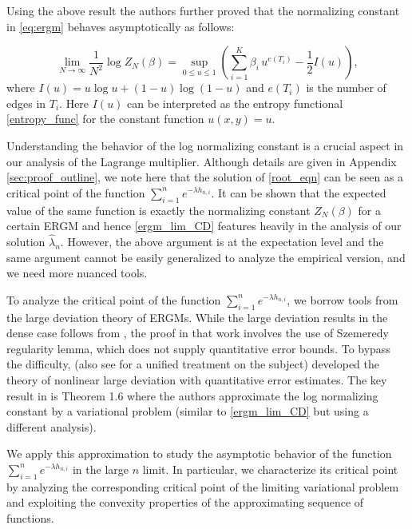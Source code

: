 \documentclass[12pt]{article}
\numberwithin{equation}{section}
\begin{document}
Using the above result the authors further proved that
the normalizing constant in \eqref{eq:ergm} behaves asymptotically as follows:

\begin{equation}
\lim_{N\to\infty}\frac{1}{N^2}
\log Z_N(\beta)
=\sup_{0\le u\le 1}\left(\sum_{i=1}^{K}\beta_i\,u^{e(T_i)}-\frac12 I(u)\right),
\label{ergm_lim_CD}
\end{equation}
where $I(u)=u\log u+(1-u)\log(1-u)$ and $e(T_i)$ is the number of edges in $T_i$. Here $I(u)$ can be interpreted as the entropy functional \eqref{entropy_func} for the constant function $u(x,y)=u$.


Understanding the behavior of the log normalizing constant is a crucial aspect in our analysis of the Lagrange multiplier. Although details are given in Appendix \ref{sec:proof_outline}, we note here that the solution of \eqref{root_eqn} can be seen as a critical point of the function $\sum_{i=1}^n e^{-{\lambda}h_{n,i}}$. It can be shown that the expected value of the same function is exactly the normalizing constant $Z_N(\beta)$ for a certain ERGM and hence \eqref{ergm_lim_CD} features heavily in the analysis of our solution $\hat{\lambda}_n$. However, the above argument is at the expectation level and the same argument cannot be easily generalized to analyze the empirical version, and we need more nuanced tools.

To analyze the critical point of the function $\sum_{i=1}^n e^{-\lambda h_{n,i}}$, we borrow tools from the large deviation theory of ERGMs.  While the large deviation results in the dense case follows from \cite{chatterjee2011large}, the proof in that work involves the use of Szemeredy regularity lemma, which does not supply quantitative error bounds. To bypass the difficulty, \cite{chatterjee2016nonlinear} (also see \cite{chatterjee2016introduction} for a unified treatment on the subject) developed the theory of nonlinear large deviation with quantitative error estimates. The key result in \cite{chatterjee2016nonlinear} is Theorem 1.6 where the authors approximate the log normalizing constant by a variational problem (similar to \eqref{ergm_lim_CD} but using a different analysis).

We apply this approximation to study the asymptotic behavior of the function 
 $\sum_{i=1}^n e^{-\lambda h_{n,i}}$  in the large $n$ limit. In particular, we characterize its critical point by analyzing the corresponding critical point of the limiting variational problem and exploiting the convexity properties of the approximating sequence of functions.
\end{document}
